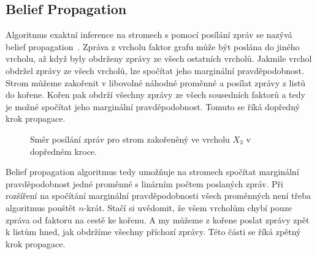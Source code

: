 \subsection{Belief Propagation}

Algoritmus exaktní inference na stromech s pomocí posílání zpráv se nazývá belief propagation~\cite{pearl1988probabilistic}.
Zpráva z vrcholu faktor grafu může být poslána do jiného vrcholu, až když byly obdrženy zprávy ze všech ostatních vrcholů.
Jakmile vrchol obdržel zprávy ze všech vrcholů, lze spočítat jeho marginální pravděpodobnost.
Strom můžeme zakořenit v libovolné náhodné proměnné a posílat zprávy z listů do kořene.
Kořen pak obdrží všechny zprávy ze všech sousedních faktorů a tedy je možné spočítat jeho marginální pravděpodobnost.
Tomuto se říká dopředný krok propagace.

\begin{figure}[H]
\begin{center}
\end{center}
\caption{Směr posílání zpráv pro strom zakořeněný ve vrcholu $X_3$ v dopředném kroce.}
\end{figure}

Belief propagation algoritmus tedy umožňuje na stromech spočítat marginální pravděpodobnost jedné proměnné s linárním počtem poslaných zpráv.
Při rozšíření na spočítání marginální pravděpodobnosti všech proměnných není třeba algoritmus pouštět $n$-krát.
Stačí si uvědomit, že všem vrcholům chybí pouze zpráva od faktoru na cestě ke kořenu.
A my můžeme z kořene poslat zprávy zpět k listům hned, jak obdržíme všechny příchozí zprávy.
Této části se říká zpětný krok propagace.

